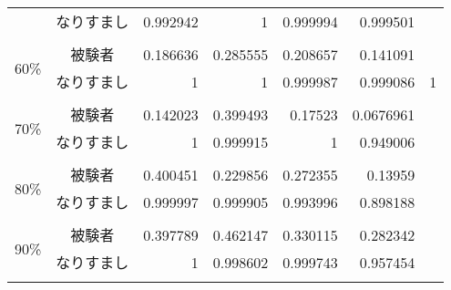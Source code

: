 \begin{center}
\begin{longtable}[btph]{|c|c|r|r|r|r|r|}
           & なりすまし & 0.992942 & 1 & 0.999994 & 0.999501 & \\ \cline{2-7} \\ \hline
      \multirow{2}{*}{60\%} & 被験者 & 0.186636  & 0.285555  & 0.208657  & 0.141091  & \\
           & なりすまし & 1 & 1 & 0.999987 & 0.999086 & 1 & \\ \cline{2-7} \\ \hline
      \multirow{2}{*}{70\%} & 被験者 & 0.142023  & 0.399493  & 0.17523   & 0.0676961 & \\
           & なりすまし & 1 & 0.999915 & 1 & 0.949006 & \\ \cline{2-7} \\ \hline
      \multirow{2}{*}{80\%} & 被験者 & 0.400451  & 0.229856  & 0.272355  & 0.13959   & \\
           & なりすまし & 0.999997 & 0.999905 & 0.993996 & 0.898188 & \\ \cline{2-7} \\ \hline
      \multirow{2}{*}{90\%} & 被験者 & 0.397789  & 0.462147  & 0.330115  & 0.282342  & \\
           & なりすまし & 1 & 0.998602 & 0.999743 & 0.957454 & \\ \cline{2-7} \\ \hline \hline
  \end{longtable}
\end{center}
